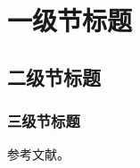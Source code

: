 
\section{一级节标题}

\subsection{二级节标题}

\subsubsection{三级节标题}

参考文献\cite{example2025}。

\section*{}
\printbibliography